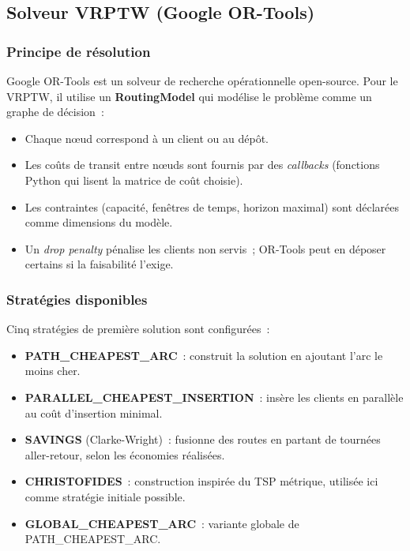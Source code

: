 \documentclass[a4paper, 12pt, twoside]{article}
\begin{document}
\subsection{Solveur VRPTW (Google OR-Tools)}

\subsubsection{Principe de r\'{e}solution}

Google OR-Tools est un solveur de recherche op\'{e}rationnelle open-source. Pour le VRPTW,
il utilise un \textbf{RoutingModel} qui mod\'{e}lise le probl\`{e}me comme un graphe de d\'{e}cision~:
\begin{itemize}
  \item Chaque n\oe ud correspond \`{a} un client ou au d\'{e}p\^{o}t.
  \item Les co\^{u}ts de transit entre n\oe uds sont fournis par des \textit{callbacks} (fonctions
        Python qui lisent la matrice de co\^{u}t choisie).
  \item Les contraintes (capacit\'{e}, fenêtres de temps, horizon maximal) sont d\'{e}clar\'{e}es
        comme dimensions du mod\`{e}le.
  \item Un \textit{drop penalty} p\'{e}nalise les clients non servis~; OR-Tools peut en d\'{e}poser
        certains si la faisabilit\'{e} l'exige.
\end{itemize}

\subsubsection{Strat\'{e}gies disponibles}

Cinq strat\'{e}gies de premi\`{e}re solution sont configur\'{e}es~:
\begin{itemize}
  \item \textbf{PATH\_CHEAPEST\_ARC}~: construit la solution en ajoutant l'arc le moins cher.
  \item \textbf{PARALLEL\_CHEAPEST\_INSERTION}~: ins\`{e}re les clients en parall\`{e}le au
        co\^{u}t d'insertion minimal.
  \item \textbf{SAVINGS} (Clarke-Wright)~: fusionne des routes en partant de tourn\'{e}es
        aller-retour, selon les \'{e}conomies r\'{e}alis\'{e}es.
  \item \textbf{CHRISTOFIDES}~: construction inspir\'{e}e du TSP m\'{e}trique, utilis\'{e}e ici
        comme strat\'{e}gie initiale possible.
  \item \textbf{GLOBAL\_CHEAPEST\_ARC}~: variante globale de PATH\_CHEAPEST\_ARC.
\end{itemize}
\end{document}
